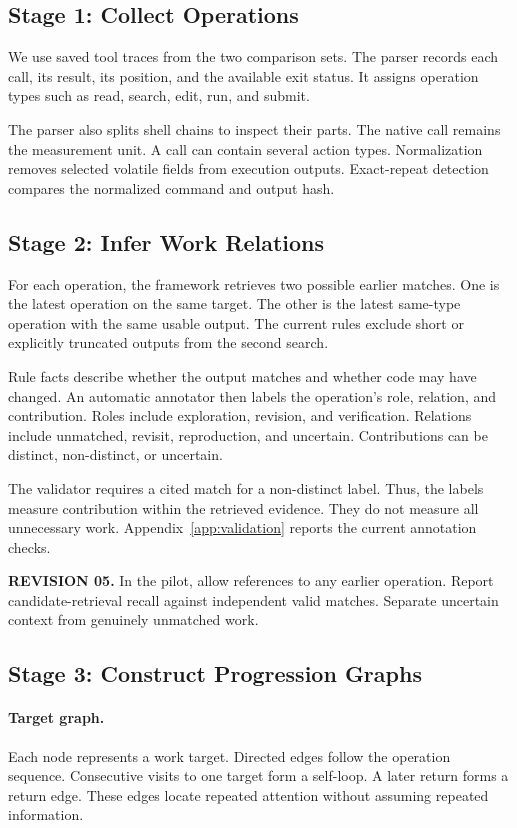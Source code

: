 \documentclass[10pt,a4paper,twocolumn]{article}
\newcommand{\rev}[2]{\par\smallskip\noindent\begin{minipage}{\linewidth}\color{revision}\footnotesize\textbf{REVISION #1.} #2\end{minipage}\par\smallskip}
\begin{document}
\subsection{Stage 1: Collect Operations}
We use saved tool traces from the two comparison sets. The parser records each call, its result, its position, and the available exit status. It assigns operation types such as read, search, edit, run, and submit.

The parser also splits shell chains to inspect their parts. The native call remains the measurement unit. A call can contain several action types. Normalization removes selected volatile fields from execution outputs. Exact-repeat detection compares the normalized command and output hash.

\subsection{Stage 2: Infer Work Relations}
For each operation, the framework retrieves two possible earlier matches. One is the latest operation on the same target. The other is the latest same-type operation with the same usable output. The current rules exclude short or explicitly truncated outputs from the second search.

Rule facts describe whether the output matches and whether code may have changed. An automatic annotator then labels the operation's role, relation, and contribution. Roles include exploration, revision, and verification. Relations include unmatched, revisit, reproduction, and uncertain. Contributions can be distinct, non-distinct, or uncertain.

The validator requires a cited match for a non-distinct label. Thus, the labels measure contribution within the retrieved evidence. They do not measure all unnecessary work. Appendix~\ref{app:validation} reports the current annotation checks.
\rev{05}{In the pilot, allow references to any earlier operation. Report candidate-retrieval recall against independent valid matches. Separate uncertain context from genuinely unmatched work.}

\subsection{Stage 3: Construct Progression Graphs}
\paragraph{Target graph.}
Each node represents a work target. Directed edges follow the operation sequence. Consecutive visits to one target form a self-loop. A later return forms a return edge. These edges locate repeated attention without assuming repeated information.
\end{document}
